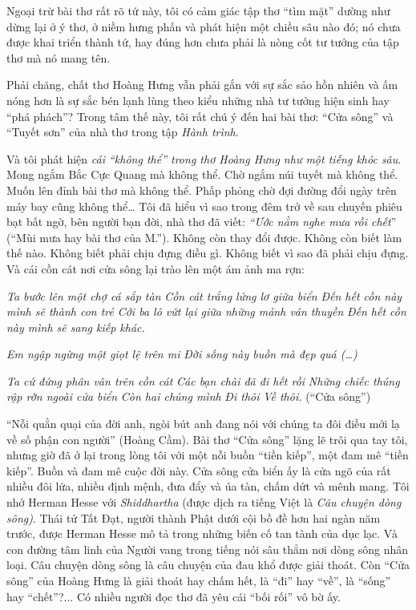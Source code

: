 \documentclass[../main.tex]{subfiles}
\begin{document}
\begin{multicols}{2}
\begin{blockquote}
\end{blockquote}
 
Ngoại trừ bài thơ rất rõ tứ này, tôi có cảm giác tập thơ “tìm mặt” dường như dừng lại ở ý thơ, ở niềm hưng phấn và phát hiện một chiều sâu nào đó; nó chưa được khai triển thành tứ, hay đúng hơn chưa phải là nòng cốt tư tưởng của tập thơ mà nó mang tên.  
 
Phải chăng, chất thơ Hoàng Hưng vẫn phải gắn với sự sắc sảo hồn nhiên và ấm nóng hơn là sự sắc bén lạnh lùng theo kiểu những nhà tư tưởng hiện sinh hay “phá phách”? Trong tâm thế này, tôi rất chú ý đến hai bài thơ: “Cửa sông” và “Tuyết sơn” của nhà thơ trong tập \textit{Hành trình}.  
 
Và tôi phát hiện \textit{cái “không thể” trong thơ Hoàng Hưng như một tiếng khóc sâu}. Mong ngắm Bắc Cực Quang mà không thể. Chờ ngắm núi tuyết mà không thể. Muốn lên đỉnh bài thơ mà không thể. Phấp phỏng chờ đợi đường đổi ngày trên máy bay cũng không thể… Tôi đã hiểu vì sao trong đêm trở về sau chuyến phiêu bạt bất ngờ, bên người bạn đời, nhà thơ đã viết: \textit{“Ước nằm nghe mưa rồi chết}” (“Mùi mưa hay bài thơ của M.”). Không còn thay đổi được. Không còn biết làm thế nào. Không biết phải chịu đựng điều gì. Không biết vì sao đã phải chịu đựng. Và cái cồn cát nơi cửa sông lại trào lên một ám ảnh ma rợn:         
\begin{blockquote}
        
\textit{Ta bước lên một chợ cá sắp tàn}        
\textit{Cồn cát trắng lửng lơ giữa biển}        
\textit{Đến hết cồn này mình sẽ thành con trẻ}        
\textit{Cởi ba lô vứt lại giữa những mảnh ván thuyền} 
\textit{Đến hết cồn này mình sẽ sang kiếp khác.} 
        
\textit{Em ngập ngừng một giọt lệ trên mi} 
\textit{Đời sống này buồn mà đẹp quá (…)} 
        
\textit{Ta cứ đứng phân vân trên cồn cát}        
\textit{Các bạn chài đã đi hết rồi}        
\textit{Những chiếc thúng rập rờn ngoài cửa biển}        
\textit{Còn hai chúng mình}        
\textit{Đi thôi}        
\textit{Về thôi.}        
(“Cửa sông”) 

\end{blockquote}
 
“Nỗi quằn quại của đời anh, ngòi bút anh đang nói với chúng ta đôi điều mới lạ về số phận con người” (Hoàng Cầm). Bài thơ “Cửa sông” lặng lẽ trôi qua tay tôi, nhưng giờ đã ở lại trong lòng tôi với một nỗi buồn “tiền kiếp”, một đam mê “tiền kiếp”. Buồn và đam mê cuộc đời này. Cửa sông cửa biển ấy là cửa ngõ của rất nhiều đôi lứa, nhiều định mệnh, đưa đẩy và úa tàn, chấm dứt và mênh mang. Tôi nhớ Herman Hesse với \textit{Shiddhartha }(được dịch ra tiếng Việt là \textit{Câu chuyện dòng sông)}. Thái tử Tất Đạt, người thành Phật dưới cội bồ đề hơn hai ngàn năm trước, được Herman Hesse mô tả trong những biến cố tan tành của dục lạc. Và con đường tâm linh của Người vang trong tiếng nói sâu thẳm nơi dòng sông nhân loại. Câu chuyện dòng sông là câu chuyện của đau khổ được giải thoát. Còn “Cửa sông” của Hoàng Hưng là giải thoát hay chấm hết, là “đi” hay “về”, là “sống” hay “chết”?... Có nhiều người đọc thơ đã yêu cái “bối rối” vô bờ ấy. 
        

\end{multicols}
\end{document}
